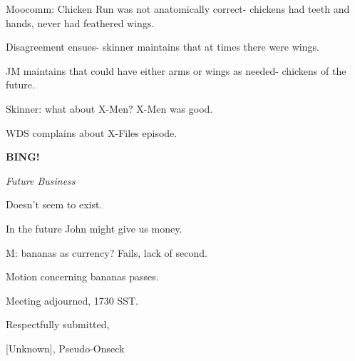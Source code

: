 \documentclass[12pt]{article}
\newcommand{\bing}{{\bf BING!} }
\newcommand{\goto}[1]{\bing \vskip 12pt \centerline{{\em{#1}}}}
\begin{document}
Moocomm: Chicken Run was not anatomically correct- chickens had teeth and hands, never had feathered wings.

Disagreement ensues- skinner maintains that at times there were wings.

JM maintains that could have either arms or wings as needed- chickens of the future.

Skinner: what about X-Men? X-Men was good.

WDS complains about X-Files episode.

\goto{Future Business}

Doesn't seem to exist.

In the future John might give us money.

M: bananas as currency? Fails, lack of second.

Motion concerning bananas passes.

\vspace{12pt}

\noindent
Meeting adjourned, 1730 SST.

\vspace{18pt}

\centerline{Respectfully submitted,}
\centerline{[Unknown], Pseudo-Onseck}
\end{document}
